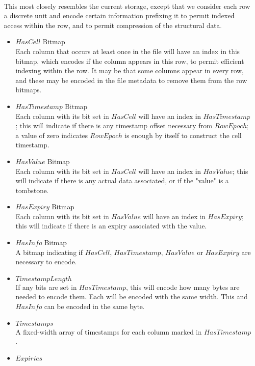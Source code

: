\documentclass[fleqn]{article}
\begin{document}
\paragraph{}
This most closely resembles the current storage, except that we consider each row a discrete unit
and encode certain information prefixing it to permit indexed access within the row, and to permit
compression of the structural data.
\begin{itemize}
  \item $HasCell$ Bitmap\\[2pt]
    Each column that occurs at least once in the file will have an index in this bitmap, which encodes
    if the column appears in this row, to permit efficient indexing within the row. It may be that some
    columns appear in every row, and these may be encoded in the file metadata to remove them from the
    row bitmaps.
  \item $HasTimestamp$ Bitmap\\[2pt]
    Each column with its bit set in $HasCell$ will have an index in $HasTimestamp$; this 
    will indicate if there is any timestamp offset necessary from $RowEpoch$; a value of zero 
    indicates $RowEpoch$ is enough by itself to construct the cell timestamp.
  \item $HasValue$ Bitmap\\[2pt]
    Each column with its bit set in $HasCell$ will have an index in $HasValue$; this 
    will indicate if there is any actual data associated, or if the "value" is a tombstone.
  \item $HasExpiry$ Bitmap\\[2pt]
    Each column with its bit set in $HasValue$ will have an index in $HasExpiry$; this 
    will indicate if there is an expiry associated with the value.
  \item $HasInfo$ Bitmap\\[2pt]
    A bitmap indicating if $HasCell$, $HasTimestamp$, $HasValue$ or $HasExpiry$ are necessary to 
    encode.
  \item $TimestampLength$\\[2pt]
    If any bits are set in $HasTimestamp$, this will encode how many bytes are needed to encode them.
    Each will be encoded with the same width. This and $HasInfo$ can be encoded in the same byte.
  \item $Timestamps$\\[2pt]
    A fixed-width array of timestamps for each column marked in $HasTimestamp$.
  \item $Expiries$\\[2pt]

\end{itemize}
\end{document}
